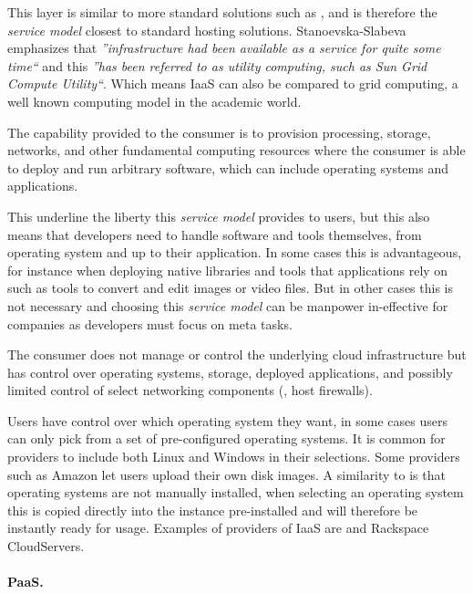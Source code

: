 This layer is similar to more standard solutions such as ,
and is therefore the \emph{service model} closest to standard hosting solutions.
Stanoevska-Slabeva~\cite{introduction:wozniak10} emphasizes that
\emph{''infrastructure had been available as a service for quite some time``} and this 
\emph{''has been referred to as utility computing, such as Sun Grid Compute Utility``}.
Which means IaaS can also be compared to grid computing, 
a well known computing model in the academic world.
\epigraph{The capability provided to the consumer is to provision 
  processing, storage, networks, and other fundamental computing resources where the 
  consumer is able to deploy and run arbitrary software, which can include operating 
  systems and applications.
}{\citet*{nist:mell11}}
This underline the liberty this \emph{service model} provides to users, but this also means
that developers need to handle software and tools themselves, from operating system and
up to their application. In some cases this is advantageous, for instance when deploying 
native libraries and tools that applications rely on such as tools to convert and edit
images or video files. But in other cases this is not necessary and choosing this \emph{service model}
can be manpower in-effective for companies as developers must focus on meta tasks.
\epigraph{The consumer does not manage or control the underlying cloud 
  infrastructure but has control over operating systems, storage, deployed applications, and 
  possibly limited control of select networking components (\eg, host firewalls).
}{}
Users have control over which operating system they want, in some cases users
can only pick from a set of pre-configured operating systems.
It is common for providers to include both Linux and Windows in their selections.
Some providers such as Amazon let users upload their own disk images.
A similarity to  is that operating systems are not manually installed,
when selecting an operating system this is copied directly into the instance pre-installed
and will therefore be instantly ready for usage.
Examples of providers of IaaS are   and Rackspace CloudServers.

\paragraph{PaaS.}

